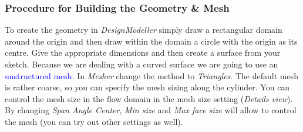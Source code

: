 \documentclass[12pts,a4paper,amsmath,amssymb,floatfix]{article}%
\newcommand{\blue}{\textcolor{blue}}
\begin{document}
     \subsubsection{Procedure for Building the Geometry \& Mesh}
     To create the geometry in \emph{DesignModeller} simply draw a rectangular domain around the origin and then draw within the domain a circle with the origin as its centre.  Give the appropriate dimensions and then create a surface from your sketch. Because we are dealing with a curved surface we are going to use an \blue{unstructured mesh}. In \emph{Mesher} change the method to \emph{Triangles}. The default mesh is rather coarse, so you can specify the mesh sizing along the cylinder. You can control the mesh size in the flow domain in the mesh size setting (\emph{Details view}).  By changing \emph{Span Angle Center}, \emph{Min size} and \emph{Max face size} will allow to control the mesh (you can try out other settings as well).
\end{document}
